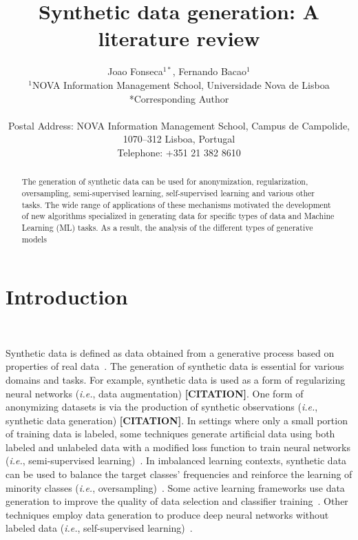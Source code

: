 \documentclass[parskip=full]{scrartcl}
\title{Synthetic data generation: A literature review}
\author{%
	Joao Fonseca\(^{1*}\), Fernando Bacao\(^{1}\)
	\\
	\small{\(^{1}\)NOVA Information Management School, Universidade Nova de Lisboa}
	\\
	\small{*Corresponding Author}
	\\
	\\
	\small{Postal Address: NOVA Information Management School, Campus de
    Campolide, 1070--312 Lisboa, Portugal}
	\\
	\small{Telephone: +351 21 382 8610}
}
\date{}
\begin{document}
\maketitle

\begin{abstract}

    The generation of synthetic data can be used for anonymization,
    regularization, oversampling, semi-supervised learning, self-supervised
    learning and various other tasks. The wide range of applications of these
    mechanisms motivated the development of new algorithms specialized in
    generating data for specific types of data and Machine Learning (ML)
    tasks. As a result, the analysis of the different types of generative
    models 



\end{abstract}

\section{Introduction}~\label{sec:introduction}

Synthetic data is defined as data obtained from a generative process based on
properties of real data~\cite{assefa2020generating}.
The generation of synthetic data is essential for various domains and tasks.
For example, synthetic data is used as a form of regularizing neural networks
(\textit{i.e.}, data augmentation) \textbf{[CITATION]}. One form of
anonymizing datasets is via the production of synthetic observations
(\textit{i.e.}, synthetic data generation) \textbf{[CITATION]}. In settings
where only a small portion of training data is labeled, some techniques
generate artificial data using both labeled and unlabeled data with a modified
loss function to train neural networks (\textit{i.e.}, semi-supervised
learning)~\cite{laine2017temporal}. In imbalanced learning contexts, synthetic
data can be used to balance the target classes' frequencies and reinforce the
learning of minority classes (\textit{i.e.},
oversampling)~\cite{fonseca2021improving}. Some active learning frameworks use
data generation to improve the quality of data selection and classifier
training~\cite{kim2021lada}. Other techniques employ data generation to
produce deep neural networks without labeled data (\textit{i.e.},
self-supervised learning)~\cite{grill2020bootstrap}.
\end{document}
